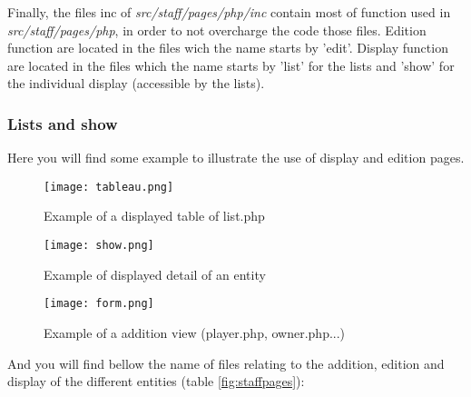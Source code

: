 \documentclass{article}
\begin{document}
Finally, the files inc of \textit{src/staff/pages/php/inc} contain most of function used in \textit{src/staff/pages/php}, in order to not overcharge the code those files. Edition function are located in the files wich the name starts by 'edit'. Display function are located in the files which the name starts by 'list' for the lists and 'show' for the individual display (accessible by the lists).

\subsubsection{Lists and show}
Here you will find some example to illustrate the use of display and edition pages.


\begin{figure}[H]
\centering
\texttt{[image: tableau.png]}
\caption{Example of a displayed table of list.php}
\end{figure}

\begin{figure}[H]
\centering
\texttt{[image: show.png]}
\caption{Example of displayed detail of an entity}
\end{figure}

\begin{figure}[H]
\centering
\texttt{[image: form.png]}
\caption{Example of a addition view (player.php, owner.php...)}
\end{figure}

And you will find bellow the name of files relating to the addition, edition and display of the different entities (table \ref{fig:staffpages}):

\end{document}
